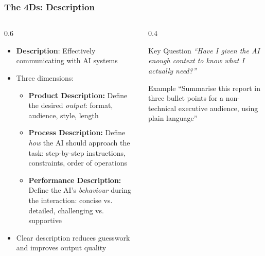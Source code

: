 \begin{frame}[fragile]\frametitle{The 4Ds: Description}
\begin{columns}
    \begin{column}[T]{0.6\linewidth}
      \begin{itemize}
        \item \textbf{Description}: Effectively communicating with AI systems
        \item Three dimensions:
          \begin{itemize}
            \item \textbf{Product Description:} Define the desired \emph{output}: format, audience, style, length
            \item \textbf{Process Description:} Define \emph{how} the AI should approach the task: step-by-step instructions, constraints, order of operations
            \item \textbf{Performance Description:} Define the AI's \emph{behaviour} during the interaction: concise vs. detailed, challenging vs. supportive
          \end{itemize}
        \item Clear description reduces guesswork and improves output quality
      \end{itemize}
    \end{column}
    \begin{column}[T]{0.4\linewidth}
      \begin{alertblock}{Key Question}
        \emph{``Have I given the AI enough context to know what I actually need?''}
      \end{alertblock}
      \vspace{0.5em}
      \begin{exampleblock}{Example}
        ``Summarise this report in three bullet points for a non-technical executive audience, using plain language''
      \end{exampleblock}
    \end{column}
  \end{columns}
\end{frame}

